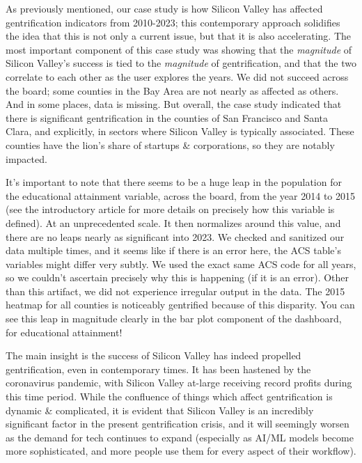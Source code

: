 \documentclass{article}
\begin{document}
    As previously mentioned, our case study is how Silicon Valley has affected gentrification indicators from 2010-2023; this contemporary approach solidifies the idea that this is not only a current issue, but that it is also accelerating. The most important component of this case study was showing that the \textit{magnitude} of Silicon Valley's success is tied to the \textit{magnitude} of gentrification, and that the two correlate to each other as the user explores the years. We did not succeed across the board; some counties in the Bay Area are not nearly as affected as others. And in some places, data is missing. But overall, the case study indicated that there is significant gentrification in the counties of San Francisco and Santa Clara, and explicitly, in sectors where Silicon Valley is typically associated. These counties have the lion's share of startups \& corporations, so they are notably impacted.
    
    It's important to note that there seems to be a huge leap in the population for the educational attainment variable, across the board, from the year 2014 to 2015 (see the introductory article for more details on precisely how this variable is defined). At an unprecedented scale. It then normalizes around this value, and there are no leaps nearly as significant into 2023. We checked and sanitized our data multiple times, and it seems like if there is an error here, the ACS table's variables might differ very subtly. We used the exact same ACS code for all years, so we couldn't ascertain precisely why this is happening (if it is an error). Other than this artifact, we did not experience irregular output in the data. The 2015 heatmap for all counties is noticeably gentrified because of this disparity. You can see this leap in magnitude clearly in the bar plot component of the dashboard, for educational attainment!
    
    The main insight is the success of Silicon Valley has indeed propelled gentrification, even in contemporary times. It has been hastened by the coronavirus pandemic, with Silicon Valley at-large receiving record profits during this time period. While the confluence of things which affect gentrification is dynamic \& complicated, it is evident that Silicon Valley is an incredibly significant factor in the present gentrification crisis, and it will seemingly worsen as the demand for tech continues to expand (especially as AI/ML models become more sophisticated, and more people use them for every aspect of their workflow). 
\end{document}
